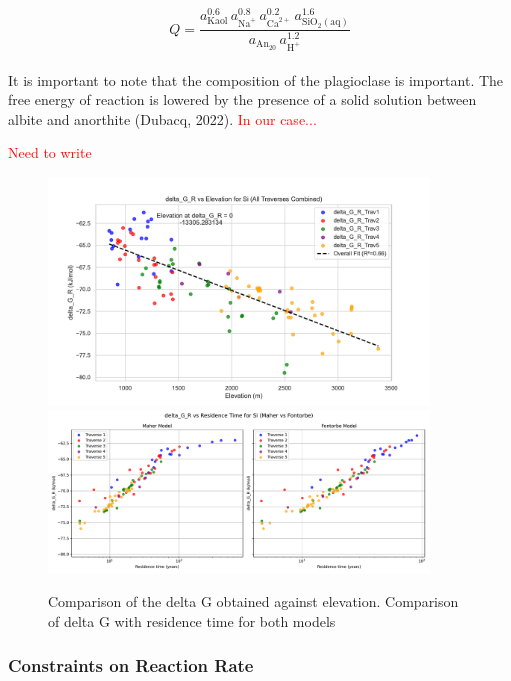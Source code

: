\begin{equation}
    Q = \frac{a_{\mathrm{Kaol}}^{0.6}\,a_{\mathrm{Na}^{+}}^{0.8}\,a_{\mathrm{Ca}^{2+}}^{0.2}\,a_{\mathrm{SiO_{2}(aq)}}^{1.6}}
           {a_{\mathrm{An_{20}}}\,a_{\mathrm{H}^{+}}^{1.2}}
\end{equation}\\

It is important to note that the composition of the plagioclase is important. The free energy of reaction is lowered by the presence of a solid solution between albite and anorthite (Dubacq, 2022). \textcolor{red}{In our case...}

\newpage

\textcolor{red}{Need to write }
\begin{figure}[H]
    \centering
    \includegraphics[width=0.9\textwidth]{delta_G_R_Si_combined_fit.pdf}
    \includegraphics[width=0.9\textwidth]{delta_G_R_Si_time_Maher_vs_Fontorbe.pdf}
    \caption{Comparison of the delta G obtained against elevation. Comparison of delta G with residence time for both models}
    \label{fig:discussion8}
\end{figure}

\FloatBarrier


\newpage

\subsubsection{Constraints on Reaction Rate}

